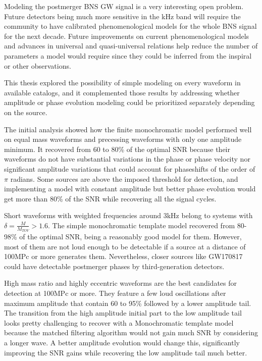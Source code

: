 Modeling the postmerger BNS GW signal is a very interesting open problem. Future detectors being much more sensitive in the kHz band will require the community to have calibrated phenomenological models for the whole BNS signal for the next decade. Future improvements on current phenomenological models and advances in universal and quasi-universal relations help reduce the number of parameters a model would require since they could be inferred from the inspiral or other observations.

This thesis explored the possibility of simple modeling on every waveform in available catalogs, and it complemented those results by addressing whether amplitude or phase evolution modeling could be prioritized separately depending on the source. 
 
The initial analysis showed how the finite monochromatic model performed well on equal mass waveforms and precessing waveforms with only one amplitude minimum. It recovered from 60 to 80\% of the optimal SNR because their waveforms do not have substantial variations in the phase or phase velocity nor significant amplitude variations that could account for phaseshifts of the order of $\pi$ radians. Some sources are above the imposed threshold for detection, and implementing a model with constant amplitude but better phase evolution would get more than 80\% of the SNR while recovering all the signal cycles.

Short waveforms with weighted frequencies around 3kHz belong to systems with $\delta=\frac{M}{M_{TOV}} > 1.6$. The simple monochromatic template model recovered from 80-98\% of the optimal SNR, being a reasonably good model for them. However, most of them are not loud enough to be detectable if a source at a distance of 100MPc or more generates them. Nevertheless, closer sources like GW170817 could have detectable postmerger phases by third-generation detectors.

High mass ratio and highly eccentric waveforms are the best candidates for detection at 100MPc or more. They feature a few loud oscillations after maximum amplitude that contain 60 to 95\% followed by a lower amplitude tail. The transition from the high amplitude initial part to the low amplitude tail looks pretty challenging to recover with a Monochromatic template model because the matched filtering algorithm would not gain much SNR by considering a longer wave. A better amplitude evolution would change this, significantly improving the SNR gains while recovering the low amplitude tail much better.


